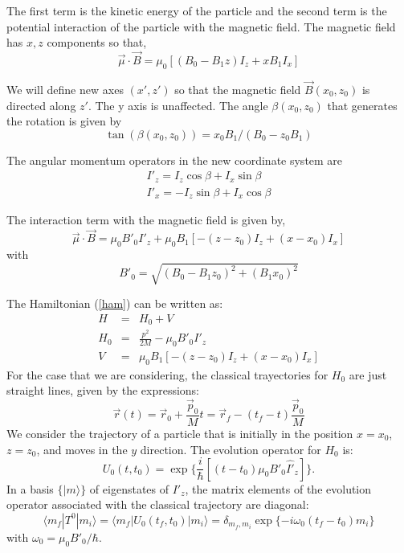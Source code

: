 \documentclass[aps,preprint,prl]{revtex4-2}
\newcommand{\be}{\begin{equation}}
\newcommand{\ee}{\end{equation}}
\newcommand{\ba}{\begin{eqnarray}}
\newcommand{\ea}{\end{eqnarray}}
\begin{document}
The first term is the kinetic energy of the particle and the second term
is the potential interaction of the particle with the magnetic field.  
The  magnetic field has  $x, z$ components so that, 
\be
\vec{\mu}\cdot \vec{B} = \mu_0[(B_0 - B_1 z){I}_z + x B_1 {I}_x]
\ee 

We will 
define new axes $(x', z')$ so that the magnetic field
$\vec B(x_0,z_0)$ is directed along $z'$. The y axis is unaffected.
The angle  $\beta(x_0,z_0) $ that  
generates the rotation  is given by
\be
\tan(\beta(x_0,z_0)) = x_0 B_1 / (B_0 - z_0 B_1)
\ee

The angular momentum operators in the new coordinate system are
\ba
{I'}_z = {I}_z \cos \beta + {I}_x \sin \beta \nonumber \\
{I'}_x = -{I}_z \sin \beta + {I}_x \cos \beta 
\ea \label{irot}

The  interaction term with the magnetic field is given by, 
\be
\vec{\mu}\cdot \vec{B} = \mu_0 B'_0 {I'}_z + \mu_0 B_1 [-(z-z_0){I}_z+
(x-x_0)I_x]
\ee 
with 
\be B'_0 = \sqrt{ (B_0 - B_1 z_0)^2 + (B_1 x_0)^2} \ee


The Hamiltonian (\ref{ham}) can be written  as:
\ba 
H &=& H_0 + V \\ 
H_0 &=& \frac{p^2}{2M} - \mu_0 B'_0 {I'}_z \\ 
V &=&  \mu_0 B_1 [-(z-z_0)I_z+
(x-x_0)I_x]
\ea
For the case that we are considering, the classical trayectories for $ H_0$ 
are just straight lines,  given by the expressions:
\be
\vec{r}(t) =  \vec{r}_0 + \frac{ \vec{p}_0}{M}t  = 
\vec{r}_f - (t_f - t) \frac{\vec{p}_0}{M} \label{ecr}
\ee
We consider the trajectory of a particle that is initially in the position 
$x=x_0$, $z=z_0$, and
moves in the $y$ direction. The evolution operator for $H_0$   is: 
\be 
{U}_0(t,t_0) = \exp \{ \frac{i}{\hbar}[ (t-t_0) \mu_0 B'_0 \hat{I'}_z ]\}.
\ee
In a basis $\{| m \rangle\}$ of eigenstates of $I'_z$, 
the matrix elements of the evolution operator
 associated with the classical trajectory are diagonal:
\be
\langle m_f|T^0|m_i \rangle = \langle m_f |U_0(t_f,t_0) |m_i \rangle = \delta_{m_f,m_i} \exp 
\{- i \omega_0(t_f - t_0)m_i \}
\ee 
with $\omega_0 = \mu_0 B'_0 /\hbar $. 
\end{document}
